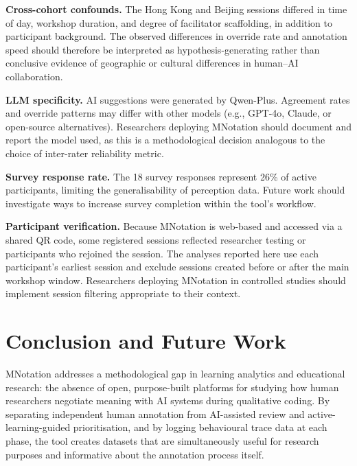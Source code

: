 \documentclass[fleqn,10pt]{JLA_article}
\begin{document}
\textbf{Cross-cohort confounds.} The Hong Kong and Beijing sessions differed in time of
day, workshop duration, and degree of facilitator scaffolding, in addition to participant
background. The observed differences in override rate and annotation speed should therefore
be interpreted as hypothesis-generating rather than conclusive evidence of geographic or
cultural differences in human--AI collaboration.

\textbf{LLM specificity.} AI suggestions were generated by Qwen-Plus. Agreement rates and
override patterns may differ with other models (e.g., GPT-4o, Claude, or open-source
alternatives). Researchers deploying MNotation should document and report the model used,
as this is a methodological decision analogous to the choice of inter-rater reliability metric.

\textbf{Survey response rate.} The 18 survey responses represent 26\% of active participants,
limiting the generalisability of perception data. Future work should investigate ways to
increase survey completion within the tool's workflow.

\textbf{Participant verification.} Because MNotation is web-based and accessed via a shared
QR code, some registered sessions reflected researcher testing or participants who rejoined
the session. The analyses reported here use each participant's earliest session and exclude
sessions created before or after the main workshop window. Researchers deploying MNotation
in controlled studies should implement session filtering appropriate to their context.

\section{Conclusion and Future Work}

MNotation addresses a methodological gap in learning analytics and educational research:
the absence of open, purpose-built platforms for studying how human researchers negotiate
meaning with AI systems during qualitative coding. By separating independent human annotation
from AI-assisted review and active-learning-guided prioritisation, and by logging behavioural
trace data at each phase, the tool creates datasets that are simultaneously useful for research
purposes and informative about the annotation process itself.
\end{document}
